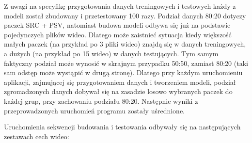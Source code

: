 Z uwagi na specyfikę przygotowania danych treningowych i testowych każdy z modeli został zbudowany i przetestowany 100 razy. Podział danych 80:20 dotyczy paczek SRC + PSV, natomiast budowa modeli odbywa się już na podstawie pojedynczych plików wideo. Dlatego może zaistnieć sytuacja kiedy większość małych paczek (na przykład po 3 pliki wideo) znajdą się w danych treningowych, a dużych (na przykład po 15 wideo) w danych testujących. Tym samym faktyczny podział może wynosić w skrajnym przypadku 50:50, zamiast 80:20 (taki sam odstęp może wystąpić w drugą stronę). Dlatego  przy  każdym uruchomieniu aplikacji, zajmującej się przygotowaniem danych  i tworzeniem modeli, podział zgromadzonych danych dobywał się na zasadzie losowo wybranych paczek do każdej grup, przy zachowaniu podziału 80:20. Następnie wyniki z przeprowadzonych uruchomień programu zostały uśrednione.\par
Uruchomienia sekwencji budowania i testowania odbywały się na następujących zestawach cech wideo:

